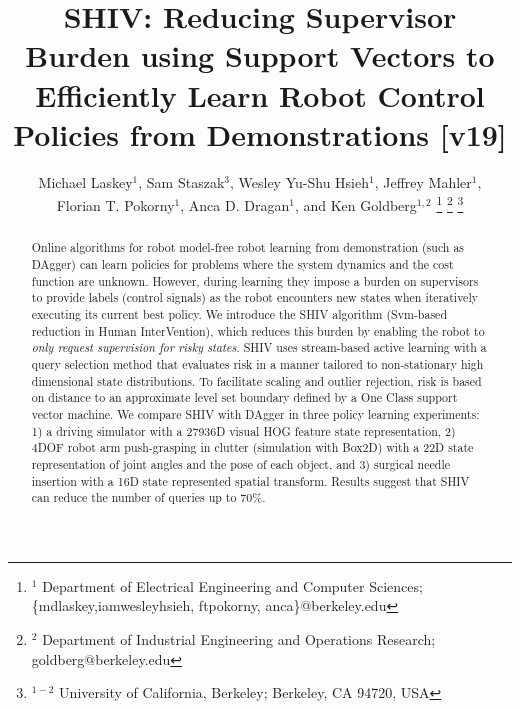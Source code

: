 \documentclass[10pt, conference]{ieeeconf}      %
\title{SHIV: Reducing Supervisor Burden using Support Vectors to Efficiently Learn Robot Control Policies from Demonstrations [v19]}
\author{Michael Laskey$^1$, Sam Staszak$^3$, Wesley Yu-Shu Hsieh$^1$, Jeffrey Mahler$^1$, \\ Florian T. Pokorny$^1$, Anca D. Dragan$^1$, and Ken Goldberg$^{1,2}$%
\thanks{$^1$ Department of Electrical Engineering and Computer Sciences; {\small \{mdlaskey,iamwesleyhsieh, ftpokorny, anca\}@berkeley.edu}}%
\thanks{$^2$ Department of Industrial Engineering and Operations Research; {\small goldberg@berkeley.edu}}%
\thanks{$^{1-2}$ University of California, Berkeley;  Berkeley, CA 94720, USA}%
}
\begin{document}
\maketitle
\thispagestyle{empty}
\pagestyle{empty}



\begin{abstract}
Online algorithms for robot model-free robot learning from demonstration (such as DAgger) can learn policies for problems where the system
dynamics and the cost function are unknown. However, during learning they impose a burden on supervisors to provide labels (control
signals) as the robot encounters new states when iteratively executing its current best policy. We introduce the SHIV
algorithm (Svm-based reduction in Human InterVention), which reduces this burden by enabling the robot to \emph{only request supervision for risky states}. SHIV uses stream-based active learning with a query selection method that evaluates risk in a manner tailored to non-stationary high dimensional state distributions.  To facilitate scaling and outlier rejection, risk is based on distance to an approximate level set boundary defined by a One Class support vector machine.  We compare SHIV with DAgger in three policy learning experiments: 1) a driving simulator with a 27936D visual HOG feature state representation, 2) 4DOF robot arm push-grasping in clutter (simulation with Box2D) with a 22D state representation  of joint angles and the pose of each object, and 3) surgical needle insertion with a 16D state represented spatial transform.  Results suggest that SHIV can reduce the number of queries up to 70$\%$.





\end{abstract}
\end{document}
